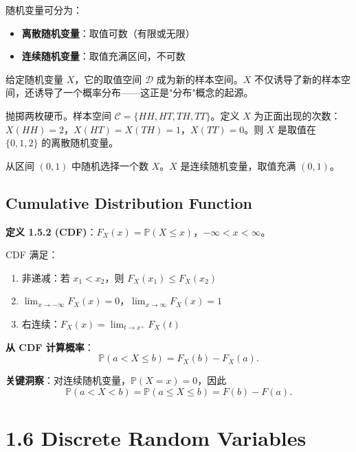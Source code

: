 随机变量可分为：
\begin{itemize}
    \item \textbf{离散随机变量}：取值可数（有限或无限）
    \item \textbf{连续随机变量}：取值充满区间，不可数
\end{itemize}

给定随机变量 $X$，它的取值空间 $\mathcal{D}$ 成为新的样本空间。$X$ 不仅诱导了新的样本空间，还诱导了一个概率分布——这正是"分布"概念的起源。

\begin{example}[硬币投掷]\label{ex:rv-coin-ch1}
抛掷两枚硬币。样本空间 $\mathcal{C} = \{HH, HT, TH, TT\}$。定义 $X$ 为正面出现的次数：$X(HH) = 2$，$X(HT) = X(TH) = 1$，$X(TT) = 0$。则 $X$ 是取值在 $\{0, 1, 2\}$ 的离散随机变量。
\end{example}

\begin{example}[均匀选择]\label{ex:rv-uniform-ch1}
从区间 $(0, 1)$ 中随机选择一个数 $X$。$X$ 是连续随机变量，取值充满 $(0, 1)$。
\end{example}

\subsection{Cumulative Distribution Function}

\begin{remark}
\textbf{定义 1.5.2 (CDF)}：$F_X(x) = \mathbb{P}(X \leq x)$，$-\infty < x < \infty$。

CDF 满足：
\begin{enumerate}
    \item 非递减：若 $x_1 < x_2$，则 $F_X(x_1) \leq F_X(x_2)$
    \item $\lim_{x \to -\infty} F_X(x) = 0$，$\lim_{x \to \infty} F_X(x) = 1$
    \item 右连续：$F_X(x) = \lim_{t \to x^+} F_X(t)$
\end{enumerate}
\end{remark}

\textbf{从 CDF 计算概率}：
\[
\mathbb{P}(a < X \leq b) = F_X(b) - F_X(a).
\label{eq:cdf-prob-ch1}
\]

\textbf{关键洞察}：对连续随机变量，$\mathbb{P}(X = x) = 0$，因此
\[
\mathbb{P}(a < X < b) = \mathbb{P}(a \leq X \leq b) = F(b) - F(a).
\label{eq:continuous-point-prob-ch1}
\]

\section{1.6 Discrete Random Variables}\label{sec:1.6}

